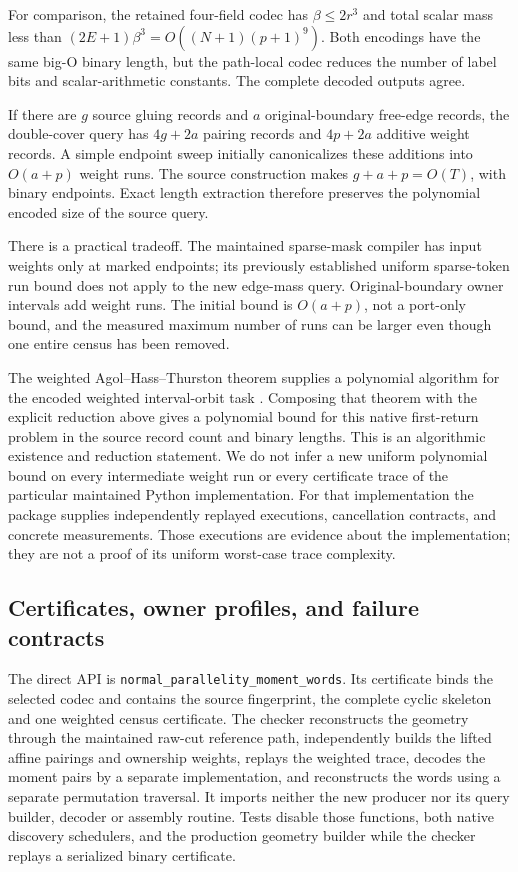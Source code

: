 For comparison, the retained four-field codec has
$\beta\leq2r^3$ and total scalar mass less than
$(2E+1)\beta^3=O((N+1)(p+1)^9)$.  Both encodings have the same big-O
binary length, but the path-local codec reduces the number of label bits
and scalar-arithmetic constants.  The complete decoded outputs agree.

If there are $g$ source gluing records and $a$ original-boundary free-edge
records, the double-cover query has $4g+2a$ pairing records and $4p+2a$
additive weight records.  A simple endpoint sweep initially canonicalizes
these additions into $O(a+p)$ weight runs.  The source construction makes
$g+a+p=O(T)$, with binary endpoints.  Exact length extraction therefore
preserves the polynomial encoded size of the source query.

There is a practical tradeoff.  The maintained sparse-mask compiler has
input weights only at marked endpoints; its previously established
uniform sparse-token run bound does not apply to the new edge-mass query.
Original-boundary owner intervals add weight runs.  The initial bound is
$O(a+p)$, not a port-only bound, and the measured maximum number of runs
can be larger even though one entire census has been removed.

The weighted Agol--Hass--Thurston theorem supplies a polynomial algorithm
for the encoded weighted interval-orbit task
\cite[Theorem~16]{AgolHassThurston2006}.  Composing that theorem with the
explicit reduction above gives a polynomial bound for this native
first-return problem in the source record count and binary lengths.  This
is an algorithmic existence and reduction statement.  We do not infer a
new uniform polynomial bound on every intermediate weight run or every
certificate trace of the particular maintained Python implementation.
For that implementation the package supplies independently replayed
executions, cancellation contracts, and concrete measurements.  Those
executions are evidence about the implementation; they are not a proof of
its uniform worst-case trace complexity.

\subsection{Certificates, owner profiles, and failure contracts}

The direct API is \texttt{normal\_parallelity\_moment\_words}.
Its certificate binds the selected codec and contains the source
fingerprint, the complete cyclic
skeleton and one weighted census certificate.  The checker reconstructs
the geometry through the maintained raw-cut reference path, independently
builds the lifted affine pairings and ownership weights, replays the
weighted trace, decodes the moment pairs by a separate implementation,
and reconstructs the words using a separate permutation traversal.  It
imports neither the new producer nor its query builder, decoder or
assembly routine.  Tests disable those functions, both native discovery
schedulers, and the production geometry builder while the checker replays
a serialized binary certificate.

